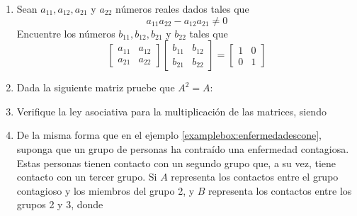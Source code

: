 \begin{enumerate}[start=35]
    \item Sean $a_{11}, a_{12}, a_{21}$ y $a_{22}$ números reales dados tales que
    $$a_{11} a_{22}-a_{12} a_{21} \neq 0$$
    Encuentre los números $b_{11}, b_{12}, b_{21}$ y $b_{22}$ tales que
    $$\begin{bmatrix*}a_{11} & a_{12} \\ a_{21} & a_{22}\end{bmatrix*}\begin{bmatrix*}b_{11} & b_{12} \\ b_{21} & b_{22}\end{bmatrix*}=\begin{bmatrix*}1 & 0 \\ 0 & 1\end{bmatrix*}$$
    \newpage
    \item Dada la siguiente matriz pruebe que $A^{2}=A$:
    \begin{matrizn}
    \end{matrizn}
    \item Verifique la ley asociativa para la multiplicación de las matrices, siendo
    \begin{matrizn}
    \end{matrizn}
    \item De la misma forma que en el ejemplo \ref{examplebox:enfermedadescone}, suponga que un grupo de personas ha contraído una enfermedad contagiosa. Estas personas tienen contacto con un segundo grupo que, a su vez, tiene contacto con un tercer grupo. Si $A$ representa los contactos entre el grupo contagioso y los miembros del grupo 2, y $B$ representa los contactos entre los grupos 2 y 3, donde

\end{enumerate}
